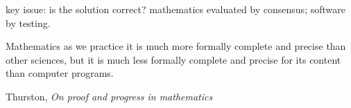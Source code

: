 \documentclass[10pt,openany]{book}
\begin{document}
key issue: is the solution correct?
mathematics evaluated by consensus;
software by testing.

\epigraph{Mathematics as we practice it is much more formally 
complete and precise than
other sciences, but it is much less formally complete and precise 
for its content
than computer programs.}%
{Thurston, 
\textit{On proof and progress in mathematics
}~\cite{thurston1994proof}}



%
\backmatter


%
\printbibliography[heading=bibintoc, title={References}]
\end{document}
